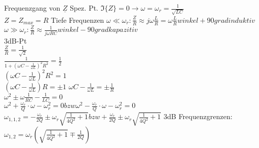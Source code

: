 Frequenzgang von $\underline Z$
Spez. Pt. $\Im{\{Z\}} = 0 \rightarrow \omega = \omega_r=\frac{1}{\sqrt{LC}}$\\
$Z = Z_{max} = R$
Tiefe Frequenzen $\omega \ll \omega_r: \frac{\underline Z}{R} \approx
j\omega\frac{L}{R}=\omega\frac{L}{R} winkel +90grad induktiv$\\
$\omega \gg \omega_r: \frac{\underline Z}{R} \approx \frac{1}{j\omega RC}
winkel -90 grad kapazitiv$\\
3dB-Pt\\
$\frac{Z}{R}=\frac{1}{\sqrt{2}}$\\
$\frac{1}{1+(\omega C-\frac{1}{\omega L})^2R^2}=\frac{1}{2}$\\
$(\omega C-\frac{1}{\omega L})^2R^2 = 1$\\
$(\omega C - \frac{1}{\omega L})R = \pm 1$
$\omega C - \frac{1}{\omega L} = \pm \frac{1}{R}$\\
$\omega^2 \pm \omega \frac{1}{RC}-\frac{1}{LC} = 0$\\
$\omega^2 + \frac{\omega_r}{Q}\cdot \omega - \omega_r^2=0 bzw \omega^2 -
\frac{\omega_r}{Q}\cdot \omega - \omega_r^2=0$\\
$\omega_{1,1,2} = -\frac{\omega_r}{2Q} \pm \omega_r\sqrt{\frac{1}{4Q^2}+1} bzw
+\frac{\omega_r}{2Q} \pm \omega_r\sqrt{\frac{1}{4Q^2}+1}$
3dB Frequenzgrenzen: $\omega_{1,2}=\omega_r(\sqrt{\frac{1}{4Q^2}+1}\mp\frac{1}{2Q})$

